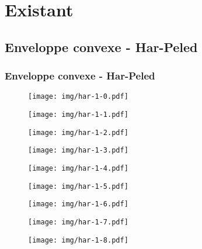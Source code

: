 \documentclass{beamer}
\begin{document}
\section{Existant}

\subsection{Enveloppe convexe - Har-Peled}
\begin{frame}
\frametitle{Enveloppe convexe - Har-Peled}

  {
    \begin{figure}[h!]
      \centering
      \texttt{[image: img/har-1-0.pdf]}
    \end{figure}
  }
  {
    \begin{figure}[h!]
      \centering
      \texttt{[image: img/har-1-1.pdf]}
    \end{figure}
  }
  {
    \begin{figure}[h!]
      \centering
      \texttt{[image: img/har-1-2.pdf]}
    \end{figure}
  }
  {
    \begin{figure}[h!]
      \centering
      \texttt{[image: img/har-1-3.pdf]}
    \end{figure}
  }
  {
    \begin{figure}[h!]
      \centering
      \texttt{[image: img/har-1-4.pdf]}
    \end{figure}
  }
  {
    \begin{figure}[h!]
      \centering
      \texttt{[image: img/har-1-5.pdf]}
    \end{figure}
  }
  {
    \begin{figure}[h!]
      \centering
      \texttt{[image: img/har-1-6.pdf]}
    \end{figure}
  }
  {
    \begin{figure}[h!]
      \centering
      \texttt{[image: img/har-1-7.pdf]}
    \end{figure}
  }
  {
    \begin{figure}[h!]
      \centering
      \texttt{[image: img/har-1-8.pdf]}
    \end{figure}
  }   

\end{frame}
\end{document}
